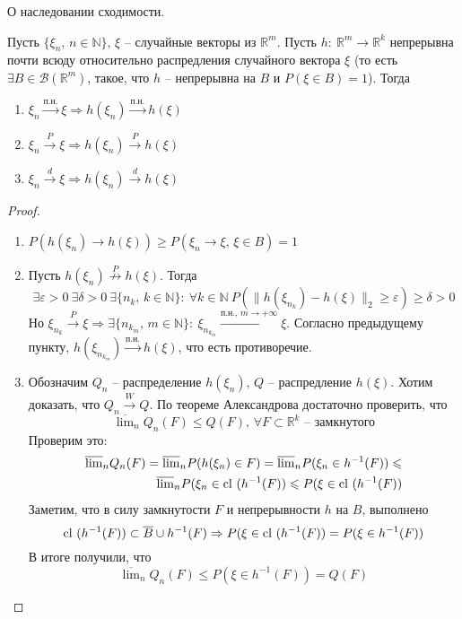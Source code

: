 \begin{theorem}
	О наследовании сходимости.

	Пусть $\{\xi_n,\, n \in \mathbb{N}\},\, \xi$ -- случайные векторы из $\mathbb{R}^m$. Пусть $h:\: \mathbb{R}^m \to \mathbb{R}^k$ непрерывна почти всюду относительно распредления случайного вектора $\xi$ (то есть $\exists B \in \mathcal{B}(\mathbb{R}^m)$, такое, что $h$ -- непрерывна на $B$ и $P(\xi \in B) = 1$). Тогда
	\begin{enumerate}
		\item $\xi_n \stackrel{\text{п.н.}}{\to} \xi \Rightarrow h(\xi_n) \stackrel{\text{п.н.}}{\to} h(\xi)$
		\item $\xi_n \stackrel{P}{\to} \xi \Rightarrow h(\xi_n) \stackrel{P}{\to} h(\xi)$
		\item $\xi_n \stackrel{d}{\to} \xi \Rightarrow h(\xi_n) \stackrel{d}{\to} h(\xi)$
	\end{enumerate}
\end{theorem}
\begin{proof}
	\begin{enumerate}
		\item $P(h(\xi_n) \to h(\xi)) \geq P(\xi_n \to \xi,\, \xi \in B) = 1$
		\item Пусть $h(\xi_n) \stackrel{P}{\not\to} h(\xi)$. Тогда
		      \[\exists \varepsilon > 0 \: \exists \delta > 0 \: \exists \{n_k,\, k \in \mathbb{N}\}:\: \forall k \in \mathbb{N} \: P(\|h(\xi_{n_k}) - h(\xi)\|_2 \geq \varepsilon) \geq \delta > 0\]
		      Но $\xi_{n_k} \stackrel{P}{\to} \xi \Rightarrow \exists \{n_{k_m},\, m \in \mathbb{N}\} :\: \xi_{n_{k_m}} \stackrel{\text{п.н.},\,m \to +\infty}{\to} \xi$. Согласно предыдущему пункту, $h(\xi_{n_{k_m}}) \stackrel{\text{п.н.}}{\to} h(\xi)$, что есть противоречие.
		\item Обозначим $Q_n$ -- распределение $h(\xi_n),\, Q$ -- распредление $h(\xi)$. Хотим доказать, что $Q_n \stackrel{W}{\to} Q$. По теореме Александрова достаточно проверить, что
		      \[\overline{\lim}_n Q_n(F) \leq Q(F),\, \forall F \subset \mathbb{R}^k \text{ -- замкнутого}\]
		      Проверим это:
		      \begin{align*}
			      \overline{\lim}_n Q_n(F) = \overline{\lim}_n P(h(\xi_n) \in F) = \overline{\lim}_n P(\xi_n \in h^{-1}(F)) \leqslant \\
			      \overline{\lim}_n P(\xi_n \in \text{cl } (h^{-1}(F)) \leqslant P(\xi \in \text{cl }(h^{-1}(F))
		      \end{align*}
		      Заметим, что в силу замкнутости $F$ и непрерывности $h$ на $B$, выполнено
		      \[\text{cl }(h^{-1}(F)) \subset \overline{B} \cup h^{-1}(F) \Rightarrow P(\xi \in \text{cl }(h^{-1}(F)) = P(\xi \in h^{-1}(F))\]
		      В итоге получили, что
		      \[\overline{\lim}_n Q_n(F) \leq P(\xi \in h^{-1}(F)) = Q(F )\]
	\end{enumerate}
\end{proof}

